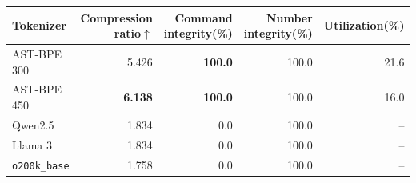 \begin{tabular*}{\linewidth}{@{\extracolsep{\fill}}lrrrr@{}}\toprule
Tokenizer & Compression ratio$\uparrow$ & Command integrity(\%) & Number integrity(\%) & Utilization(\%)\\\midrule
AST-BPE 300 & 5.426 & \textbf{100.0} & 100.0 & 21.6\\
AST-BPE 450 & \textbf{6.138} & \textbf{100.0} & 100.0 & 16.0\\
Qwen2.5 & 1.834 & 0.0 & 100.0 & --\\
Llama 3 & 1.834 & 0.0 & 100.0 & --\\
\texttt{o200k\_base} & 1.758 & 0.0 & 100.0 & --\\
\bottomrule\end{tabular*}